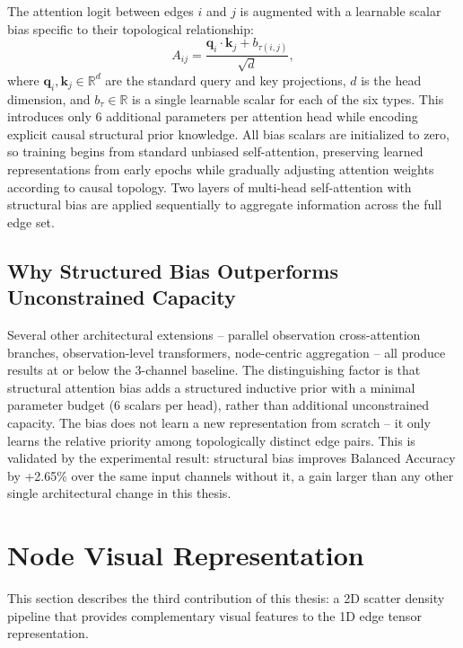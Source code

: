 The attention logit between edges $i$ and $j$ is augmented with a learnable scalar bias specific to their topological relationship:
\begin{equation}
A_{ij} = \frac{\mathbf{q}_i \cdot \mathbf{k}_j + b_{\tau(i,j)}}{\sqrt{d}},
\label{eq:struct_bias}
\end{equation}
where $\mathbf{q}_i, \mathbf{k}_j \in \mathbb{R}^d$ are the standard query and key projections, $d$ is the head dimension, and $b_{\tau} \in \mathbb{R}$ is a single learnable scalar for each of the six types. This introduces only 6 additional parameters per attention head while encoding explicit causal structural prior knowledge. All bias scalars are initialized to zero, so training begins from standard unbiased self-attention, preserving learned representations from early epochs while gradually adjusting attention weights according to causal topology. Two layers of multi-head self-attention with structural bias are applied sequentially to aggregate information across the full edge set.

\subsection{Why Structured Bias Outperforms Unconstrained Capacity}

Several other architectural extensions -- parallel observation cross-attention branches, observation-level transformers, node-centric aggregation -- all produce results at or below the 3-channel baseline. The distinguishing factor is that structural attention bias adds a structured inductive prior with a minimal parameter budget (6 scalars per head), rather than additional unconstrained capacity. The bias does not learn a new representation from scratch -- it only learns the relative priority among topologically distinct edge pairs. This is validated by the experimental result: structural bias improves Balanced Accuracy by +2.65\% over the same input channels without it, a gain larger than any other single architectural change in this thesis.

\section{Node Visual Representation}
\label{sec:node_pipeline}

This section describes the third contribution of this thesis: a 2D scatter density pipeline that provides complementary visual features to the 1D edge tensor representation.

